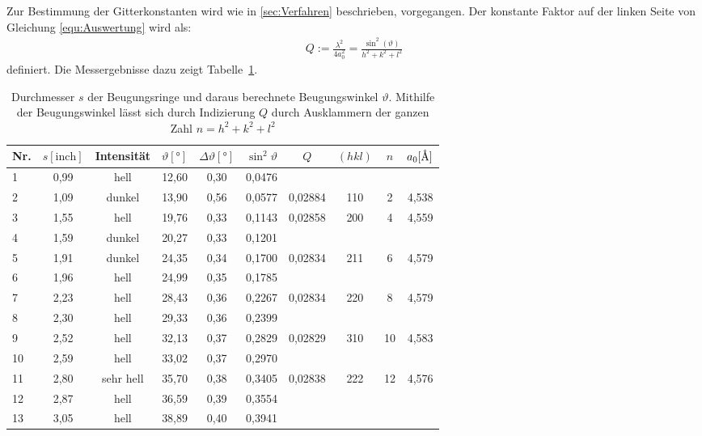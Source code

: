 \documentclass[a4paper,twoside,final]{article}
\begin{document}
Zur Bestimmung der Gitterkonstanten wird wie in \ref{sec:Verfahren} beschrieben, vorgegangen. Der konstante Faktor auf der linken Seite von Gleichung \ref{equ:Auswertung}
wird als:
\begin{align}
  Q :=\frac{\lambda^2}{4 a_0^2} = \frac{\sin^2(\vartheta)}{h^2 + k^2+l^2}\label{eqn:Q_Parameter}
\end{align} definiert. Die Messergebnisse dazu zeigt Tabelle~\ref{tab:Q_Paramter}.
\begin{table}[ht]
	\centering
	\caption{Durchmesser $s$ der Beugungsringe und daraus berechnete Beugungswinkel $\vartheta$. Mithilfe der Beugungswinkel lässt sich durch Indizierung $Q$ durch Ausklammern der ganzen Zahl $n = h^2 +k^2 +l^2$}
	\label{tab:Q_Paramter}
	\begin{tabular}{l c c c c c | c c c c}
		\toprule
      Nr. & $s [\text{inch}]$ & Intensität & $\vartheta [\si{\degree}]$ & $\Delta \vartheta [\si{\degree}]$ & $\sin^2 \vartheta $ & $Q$ & $(hkl)$ & $n$ & $a_0 [\si{\textup{\AA}}]$\\
    \midrule
1  & 0,99 & hell      & 12,60 & 0,30 & 0,0476 &         &     &    &       \\
2  & 1,09 & dunkel    & 13,90 & 0,56 & 0,0577 & 0,02884 & 110 & 2  & 4,538 \\
3  & 1,55 & hell      & 19,76 & 0,33 & 0,1143 & 0,02858 & 200 & 4  & 4,559 \\
4  & 1,59 & dunkel    & 20,27 & 0,33 & 0,1201 &         &     &    &       \\
5  & 1,91 & dunkel    & 24,35 & 0,34 & 0,1700 & 0,02834 & 211 & 6  & 4,579 \\
6  & 1,96 & hell      & 24,99 & 0,35 & 0,1785 &         &     &    &       \\
7  & 2,23 & hell      & 28,43 & 0,36 & 0,2267 & 0,02834 & 220 & 8  & 4,579 \\
8  & 2,30 & hell      & 29,33 & 0,36 & 0,2399 &         &     &    &       \\
9  & 2,52 & hell      & 32,13 & 0,37 & 0,2829 & 0,02829 & 310 & 10 & 4,583 \\
10 & 2,59 & hell      & 33,02 & 0,37 & 0,2970 &         &     &    &       \\
11 & 2,80 & sehr hell & 35,70 & 0,38 & 0,3405 & 0,02838 & 222 & 12 & 4,576 \\
12 & 2,87 & hell      & 36,59 & 0,39 & 0,3554 &         &     &    &       \\
13 & 3,05 & hell      & 38,89 & 0,40 & 0,3941 &         &     &    &       \\

\end{tabular}
\end{table}
\end{document}
